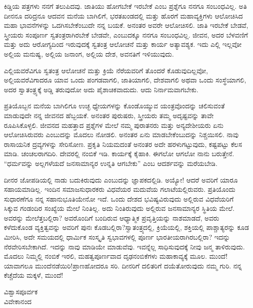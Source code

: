 ಕಿಡ್ಡಿಯ ಪತ್ರಗಳು ನನಗೆ ತಲುಪಿದವು. ಜಾತಿಯು ಹೋಗಬೇಕೆ ಇರಬೇಕೆ ಎಂಬ ಪ್ರಶ್ನೆಗೂ ನನಗೂ ಸಂಬಂಧವಿಲ್ಲ. ಅತಿ ದೀನನೂ ದರಿದ್ರನೂ ಆದವನ ಮನೆಯ ಬಾಗಿಲಿಗೆ, ಭರತಖಂಡದಲ್ಲಿ ಮತ್ತು ಹೊರಗೆ ಮಹಾವ್ಯಕ್ತಿಗಳು ಆಲೋಚಿಸಿದ ಮಹಾ ಭಾವನೆಗಳನ್ನು ಒದಗಿಸಬೇಕೆಂಬುದೇ ನನ್ನ ಬಯಕೆ. ಅನಂತರ ಅವರೇ ಆಲೋಚಿಸಲಿ. ಜಾತಿ ಇರಬೇಕೆ ಬೇಡವೆ, ಸ್ತ್ರೀಯರು ಸಂಪೂರ್ಣ ಸ್ವತಂತ್ರರಾಗಿರಬೇಕೆ ಬೇಡವೇ, ಎಂಬುದಕ್ಕೂ ನನಗೂ ಸಂಬಂಧವಿಲ್ಲ. ಜೀವನ, ಅದರ ಬೆಳವಣಿಗೆ ಮತ್ತು ಅದು ಆರೋಗ್ಯದಿಂದ ಇರುವುದಕ್ಕೆ ಸ್ವತಂತ್ರ ಆಲೋಚನೆ ಮತ್ತು ಕಾರ್ಯ ಅತ್ಯಾವಶ್ಯಕ. ಇದು ಎಲ್ಲಿ ಇಲ್ಲವೋ ಅಲ್ಲಿಯ ಮನುಷ್ಯ, ಅಲ್ಲಿಯ ಜನಾಂಗ, ಅಲ್ಲಿಯ ದೇಶ, ಅವನತಿಗೆ ಇಳಿಯುವುದು.

ಎಲ್ಲಿಯವರೆವಿಗೂ ಸ್ವತಂತ್ರ ಆಲೋಚನೆ ಮತ್ತು ಕ್ರಿಯೆ ನೆರೆಯವರಿಗೆ ತೊಂದರೆ ಕೊಡುವುದಿಲ್ಲವೋ, ಅಲ್ಲಿಯವರೆವಿಗಾದರೂ ಯಾವ ಒಂದು ಪಂಗಡವಾಗಲಿ, ಜಾತಿಯಾಗಲಿ, ದೇಶವಾಗಲಿ ಅಥವಾ ಒಂದು ಸಂಸ್ಥೆಯಾಗಲಿ, ಅದರ ಸ್ವಾತಂತ್ರ್ಯಕ್ಕೆ ಅಡ್ಡಿ ತರುವುದೋ ಅದು ಪೈಶಾಚಿಕವಾದುದು. ಆದು ನಿರ್ನಾಮವಾಗಬೇಕು.

ಪ್ರತಿಯೊಬ್ಬನ ಮನೆಯ ಬಾಗಿಲಿಗೂ ಉಚ್ಛ ಧ್ಯೇಯಗಳನ್ನು ಕೊಂಡೊಯ್ಯುವ ಯಂತ್ರವೊಂದನ್ನು ಚಲಿಸುವಂತೆ ಮಾಡುವುದೇ ನನ್ನ ಜೀವನದ ಹೆಬ್ಬಯಕೆ. ಅನಂತರ ಪುರುಷರು, ಸ್ತ್ರೀಯರು ತಮ್ಮ ಅದೃಷ್ಟವನ್ನು ತಾವೇ ರೂಪಿಸಿಕೊಳ್ಳಲಿ. ಜೀವನದ ಮಹತ್ತಾದ ಪ್ರಶ್ನೆಗಳ ಮೇಲೆ ನಮ್ಮ ಪುರಾತನರು ಮತ್ತು ಅನ್ಯದೇಶೀಯರು ಏನು ಆಲೋಚಿಸಿರುವರು ಎಂಬುದನ್ನು ಮೊದಲು ನೋಡಲಿ. ಅನಂತರ ಏನು ಮಾಡಬೇಕೆಂಬುದನ್ನು ನಿಶ್ಚಯಿಸಲಿ. ನಾವು ರಾಸಾಯನಿಕ ದ್ರವ್ಯಗಳನ್ನು ಸೇರಿಸೋಣ. ಪ್ರಕೃತಿ ನಿಯಮದಂತೆ ಅನಂತರ ಅದೇ ಹರಳುಗಟ್ಟುವುದು, ಕಷ್ಟಪಟ್ಟು ಕೆಲಸ ಮಾಡಿ. ಚಂಚಲರಾಗದಿರಿ. ದೇವರಲ್ಲಿ ನಂಬಿಕೆ ಇಡಿ. ಕಾರ್ಯಕ್ಕೆ ಕೈಹಾಕಿ. ಈಗಲೋ ಆಗಲೋ ನಾನು ಬರುತ್ತೇನೆ. “ಧರ್ಮವನ್ನು ಅಲ್ಲಗಳೆಯದೆ ಜನಸಾಮಾನ್ಯರ ಉನ್ನತಿ ಆಗಬೇಕು” ಎಂಬ ಆದರ್ಶವನ್ನು ಮರೆಯಬೇಡಿ.

ದೀನರ ಜೋಪಡಿಯಲ್ಲಿ ನಾಡು ಬದುಕಿರುವುದು ಎಂಬುದನ್ನು ಜ್ಞಾಪಕದಲ್ಲಿಡಿ. ಅಯ್ಯೋ! ಆದರೆ ಅವರಿಗೆ ಯಾರೂ ಸಹಾಯಮಾಡಿಲ್ಲ. ಇಂದಿನ ಸಮಾಜಸುಧಾರಕರು ವಿಧವೆಯರ ಮದುವೆಯ ಗಲಾಟೆಯಲ್ಲಿರುವರು. ಪ್ರತಿಯೊಂದು ಸುಧಾರಣೆಗೂ ನನ್ನ ಸಹಾನುಭೂತಿಯೇನೋ ಇದೆ. ಒಂದು ದೇಶದ ಭವಿಷ್ಯವಿರುವುದು ಅಲ್ಲಿರುವ ವಿಧವೆಯರಿಗೆ ಸಿಕ್ಕುವ ಗಂಡಂದಿರ ಸಂಖ್ಯೆಯ ಮೇಲೆ ನಿಂತಿಲ್ಲ. ಅದು ನಿಂತಿರುವುದು ಅಲ್ಲಿರುವ ಜನಸಾಮಾನ್ಯರ ಸ್ಥಿತಿಯ ಮೇಲೆ. ಅವರನ್ನು ಮೇಲೆತ್ತಬಲ್ಲಿರಾ? ಅವರೊಂದಿಗೆ ಬಂದಿರುವ ಆಧ್ಯಾತ್ಮಿಕ ಪ್ರವೃತ್ತಿಯನ್ನು ನಾಶಮಾಡದೆ, ಅವರು ಕಳೆದುಕೊಂಡ ವ್ಯಕ್ತಿತ್ವವನ್ನು ಅವರಿಗೆ ಪುನಃ ಕೊಡಬಲ್ಲಿರಾ?ಸ್ವಾತಂತ್ರ್ಯದಲ್ಲಿ, ಕ್ರಿಯೆಯಲ್ಲಿ, ಶಕ್ತಿಯಲ್ಲಿ ಪಾಶ್ಚಾತ್ಯರನ್ನು ಕೂಡ ಮೀರಿಸಿ, ಅದೇ ಸಮಯದಲ್ಲಿ ಧಾರ್ಮಿಕ ಸಂಸ್ಕೃತಿ ಸ್ವಭಾವಗಳಲ್ಲಿ ಪೂರ್ಣ ಭಾರತೀಯರಾಗಿರಬಲ್ಲಿರಾ? ಇದನ್ನು ನೆರವೇರಿಸಬೇಕಾಗಿದೆ. ಇದನ್ನು ನಾವು ಮಾಡಿಯೇ ಮಾಡುವೆವು. ಇವನ್ನೆಲ್ಲ ಸಾಧಿಸುವುದಕ್ಕೆ ನೀವು ಜನ್ಮ ತಾಳಿರುವುದು. ಮೊದಲು ನಿಮ್ಮಲ್ಲಿ ನಂಬಿಕೆ ಇರಲಿ, ಮಹತ್ವಪೂರ್ಣವಾದ ದೃಢನಂಬಿಕೆಗಳು ಮಹಾಕಾವ್ಯಕ್ಕೆ ಮೂಲ. ಮುಂದೆ!\break ಯಾವಾಗಲೂ ಮುಂದೆನಡೆಯಿರಿ!ಪ್ರಾಣಹೋದರೂ ಸರಿ. ದೀನರಿಗೆ ದಲಿತರಿಗೆ ದಯೆತೋರುವುದು ನಮ್ಮ ಗುರಿ. ನನ್ನ ಕೆಚ್ಚೆದೆಯ ಮಕ್ಕಳೆ, ಮುಂದೆ!

\vspace{-0.5cm}

\begin{flushright}
ವಿಶ್ವಾಸಪೂರ್ವಕ\\ವಿವೇಕಾನಂದ
\end{flushright}
\vspace{-0.3cm}

